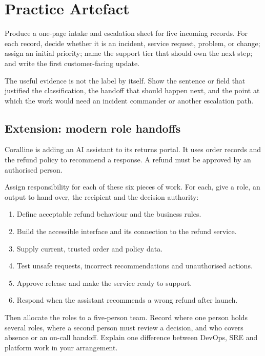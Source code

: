 \section{Practice Artefact}

Produce a one-page intake and escalation sheet for five incoming records. For each record, decide whether it is an incident, service request, problem, or change; assign an initial priority; name the support tier that should own the next step; and write the first customer-facing update.


The useful evidence is not the label by itself. Show the sentence or field that justified the classification, the handoff that should happen next, and the point at which the work would need an incident commander or another escalation path.




\subsection{Extension: modern role handoffs}


Coralline is adding an AI assistant to its returns portal. It uses order records and the refund policy to recommend a response. A refund must be approved by an authorised person.


Assign responsibility for each of these six pieces of work. For each, give a role, an output to hand over, the recipient and the decision authority:


\begin{enumerate}[leftmargin=*]
\item Define acceptable refund behaviour and the business rules.
\item Build the accessible interface and its connection to the refund service.
\item Supply current, trusted order and policy data.
\item Test unsafe requests, incorrect recommendations and unauthorised actions.
\item Approve release and make the service ready to support.
\item Respond when the assistant recommends a wrong refund after launch.
\end{enumerate}

Then allocate the roles to a five-person team. Record where one person holds several roles, where a second person must review a decision, and who covers absence or an on-call handoff. Explain one difference between DevOps, SRE and platform work in your arrangement.



